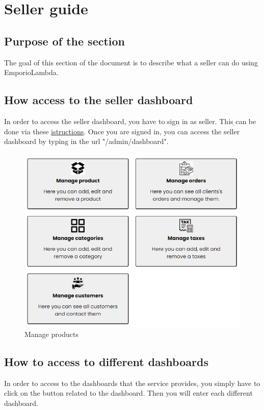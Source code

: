 \section{Seller guide} \label{_venditore}
\subsection{Purpose of the section}
The goal of this section of the document is to describe what a seller can do using EmporioLambda.

\subsection{How access to the seller dashboard} \label{_adminlogin}
In order to access the seller dashboard, you have to sign in as seller. This can be done via these \hyperref[_signin]{istructions}.
Once you are signed in, you can access the seller dashboard by typing in the url "/admin/dashboard".
\begin{figure}[H]
    \centering
    \includegraphics[width=\linewidth]{res/images/venditore/dashboard.png}
    \caption{Manage products}
\end{figure}

\subsection{How to access to different dashboards} \label{_dashboard}
In order to access to the dashboards that the service provides, you simply have to click on the button related to the dashboard. Then you will enter each different dashboard.

